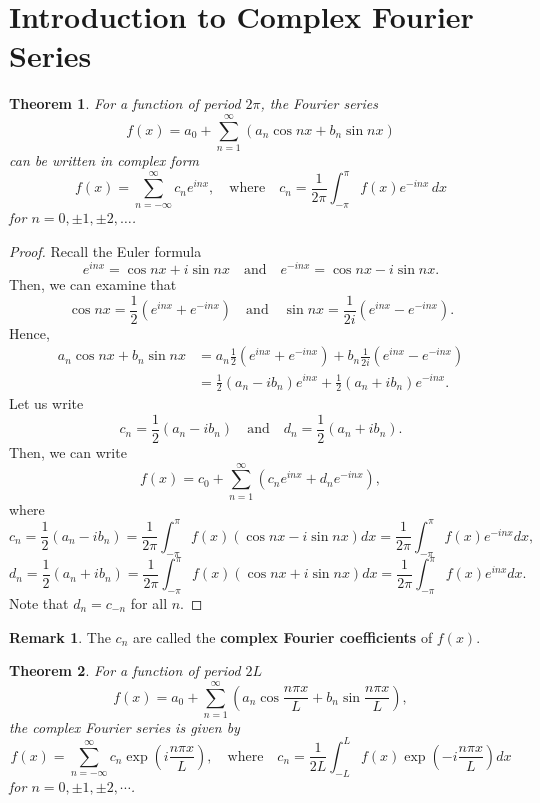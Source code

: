 \documentclass[12pt,openany]{book}
\newtheorem{theorem}{Theorem}[chapter]
\theoremstyle{definition}
\newtheorem{remark}{Remark}[chapter]
\begin{document}
	\section{Introduction to Complex Fourier Series}
	\begin{tcolorbox}[colframe=thmcolor, title={\color{white}\bf Complex Fourier Series}]
		\begin{theorem}
			For a function of period \(2\pi\), the Fourier series
			\[
			f(x) = a_0 + \sum_{n=1}^{\infty} (a_n \cos nx + b_n \sin nx)
			\]
			can be written in complex form
			\[
			f(x) = \sum_{n=-\infty}^{\infty} c_n e^{inx}, \quad \text{where} \quad c_n = \frac{1}{2\pi} \int_{-\pi}^{\pi} f(x)e^{-inx} \, dx
			\]
			for \( n = 0, \pm1, \pm2, \ldots \).
		\end{theorem}
	\end{tcolorbox}
	\begin{proof}
		Recall the Euler formula
		\[
		e^{inx} = \cos nx + i \sin nx \quad \text{and} \quad e^{-inx} = \cos nx - i \sin nx.
		\] Then, we can examine that
		\[
		\cos nx = \frac{1}{2} \left( e^{inx} + e^{-inx} \right) \quad \text{and} \quad \sin nx = \frac{1}{2i} \left( e^{inx} - e^{-inx} \right).
		\] Hence,
		\begin{align*}
			a_n \cos nx + b_n \sin nx &= a_n \frac{1}{2} \left( e^{inx} + e^{-inx} \right) + b_n \frac{1}{2i} \left( e^{inx} - e^{-inx} \right) \\
			&= \frac{1}{2} (a_n - ib_n)e^{inx} + \frac{1}{2} (a_n + ib_n)e^{-inx}.
		\end{align*}
		Let us write
		\[
		c_n = \frac{1}{2}(a_n - ib_n) \quad \text{and} \quad d_n = \frac{1}{2}(a_n + ib_n).
		\] Then, we can write
		\[
		f(x) = c_0 + \sum_{n=1}^{\infty} \left( c_n e^{inx} + d_n e^{-inx} \right),
		\]
		where
		\[
		c_n = \frac{1}{2} (a_n - ib_n) = \frac{1}{2\pi} \int_{-\pi}^{\pi} f(x) \left( \cos nx - i \sin nx \right) dx = \frac{1}{2\pi} \int_{-\pi}^{\pi} f(x)e^{-inx} dx,
		\]
		\[
		d_n = \frac{1}{2} (a_n + ib_n) = \frac{1}{2\pi} \int_{-\pi}^{\pi} f(x) \left( \cos nx + i \sin nx \right) dx = \frac{1}{2\pi} \int_{-\pi}^{\pi} f(x)e^{inx} dx.
		\] Note that \( d_n = c_{-n} \) for all \( n \).
	\end{proof}
	\begin{remark}
		The \( c_n \) are called the \textbf{complex Fourier coefficients} of \( f(x) \).
	\end{remark}
	\vspace{12pt}
	\begin{tcolorbox}[colframe=thmcolor, title={\color{white}\bf }]
		\begin{theorem}
			
			For a function of period \(2L\)
			\[
			f(x) = a_0 + \sum_{n=1}^{\infty} \left( a_n \cos \frac{n\pi x}{L} + b_n \sin \frac{n\pi x}{L} \right),
			\]
			the complex Fourier series is given by
			\[
			f(x) = \sum_{n=-\infty}^{\infty} c_n \exp \left( i\frac{n\pi x}{L} \right),\quad
			\text{where}\quad
			c_n = \frac{1}{2L} \int_{-L}^{L} f(x) \exp \left( -i\frac{n\pi x}{L} \right) dx
			\]
			for \( n = 0, \pm1, \pm2, \cdots \).
		\end{theorem}
	\end{tcolorbox}
	
\end{document}
